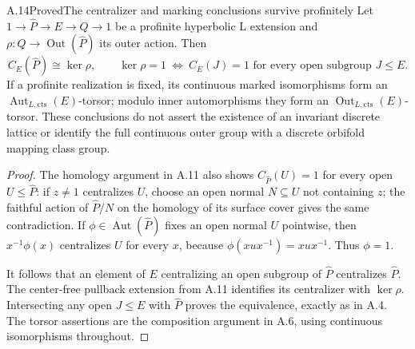 \begin{statement}{A.14}{Proved}{The centralizer and marking conclusions survive profinitely}
Let $1\to\widehat P\to E\to Q\to1$ be a profinite
hyperbolic L extension and $\rho:Q\to\operatorname{Out}(\widehat P)$
its outer action. Then
\[
 C_E(\widehat P)\cong\ker\rho,
 \qquad
 \ker\rho=1\ \Longleftrightarrow\ C_E(J)=1
       \text{ for every open subgroup }J\leq E.
\]
If a profinite realization is fixed, its continuous marked
isomorphisms form an $\operatorname{Aut}_{L,\mathrm{cts}}(E)$-torsor;
modulo inner automorphisms they form an
$\operatorname{Out}_{L,\mathrm{cts}}(E)$-torsor.
These conclusions do not assert the existence of an
invariant discrete lattice or identify the full continuous
outer group with a discrete orbifold mapping class group.
\end{statement}
\begin{proof}
The homology argument in A.11 also shows
$C_{\widehat P}(U)=1$ for every open $U\leq\widehat P$:
if $z\ne1$ centralizes $U$, choose an open normal
$N\subseteq U$ not containing $z$; the faithful action of
$\widehat P/N$ on the homology of its surface cover gives
the same contradiction. If $\phi\in\operatorname{Aut}(\widehat P)$
fixes an open normal $U$ pointwise, then
$x^{-1}\phi(x)$ centralizes $U$ for every $x$, because
$\phi(xux^{-1})=xux^{-1}$. Thus $\phi=1$.

It follows that an element of $E$ centralizing an open
subgroup of $\widehat P$ centralizes $\widehat P$.
The center-free pullback extension from A.11 identifies
its centralizer with $\ker\rho$. Intersecting any open
$J\leq E$ with $\widehat P$ proves the equivalence,
exactly as in A.4. The torsor assertions are the
composition argument in A.6, using continuous
isomorphisms throughout.
\end{proof}

